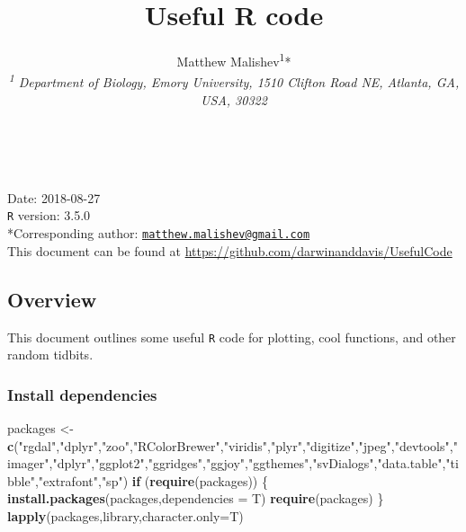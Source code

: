 \documentclass[10,portrait]{article}
\title{Useful R code}
\author{Matthew Malishev\textsuperscript{1}*\\
\emph{\textsuperscript{1} Department of Biology, Emory University, 1510
Clifton Road NE, Atlanta, GA, USA, 30322}}
\date{}
\newenvironment{Shaded}{\begin{snugshade}}{\end{snugshade}}
\newcommand{\KeywordTok}[1]{\textcolor[rgb]{0.13,0.29,0.53}{\textbf{#1}}}
\newcommand{\DataTypeTok}[1]{\textcolor[rgb]{0.13,0.29,0.53}{#1}}
\newcommand{\StringTok}[1]{\textcolor[rgb]{0.31,0.60,0.02}{#1}}
\newcommand{\ControlFlowTok}[1]{\textcolor[rgb]{0.13,0.29,0.53}{\textbf{#1}}}
\newcommand{\NormalTok}[1]{#1}
\begin{document}
\maketitle

{
\hypersetup{linkcolor=black}
\setcounter{tocdepth}{4}
\tableofcontents
}
~

Date: 2018-08-27\\
\texttt{R} version: 3.5.0\\
*Corresponding author:
\href{mailto:matthew.malishev@gmail.com}{\nolinkurl{matthew.malishev@gmail.com}}\\
This document can be found at
\url{https://github.com/darwinanddavis/UsefulCode}

\newpage  

\subsection{Overview}\label{overview}

This document outlines some useful \texttt{R} code for plotting, cool
functions, and other random tidbits.

\subsubsection{Install dependencies}\label{install-dependencies}

\begin{Shaded}
\begin{Highlighting}[]
\NormalTok{packages <-}\StringTok{ }\KeywordTok{c}\NormalTok{(}\StringTok{"rgdal"}\NormalTok{,}\StringTok{"dplyr"}\NormalTok{,}\StringTok{"zoo"}\NormalTok{,}\StringTok{"RColorBrewer"}\NormalTok{,}\StringTok{"viridis"}\NormalTok{,}\StringTok{"plyr"}\NormalTok{,}\StringTok{"digitize"}\NormalTok{,}\StringTok{"jpeg"}\NormalTok{,}\StringTok{"devtools"}\NormalTok{,}\StringTok{"imager"}\NormalTok{,}\StringTok{"dplyr"}\NormalTok{,}\StringTok{"ggplot2"}\NormalTok{,}\StringTok{"ggridges"}\NormalTok{,}\StringTok{"ggjoy"}\NormalTok{,}\StringTok{"ggthemes"}\NormalTok{,}\StringTok{"svDialogs"}\NormalTok{,}\StringTok{"data.table"}\NormalTok{,}\StringTok{"tibble"}\NormalTok{,}\StringTok{"extrafont"}\NormalTok{,}\StringTok{"sp"}\NormalTok{)   }
\ControlFlowTok{if}\NormalTok{ (}\KeywordTok{require}\NormalTok{(packages)) \{}
    \KeywordTok{install.packages}\NormalTok{(packages,}\DataTypeTok{dependencies =}\NormalTok{ T)}
    \KeywordTok{require}\NormalTok{(packages)}
\NormalTok{\}}
\KeywordTok{lapply}\NormalTok{(packages,library,}\DataTypeTok{character.only=}\NormalTok{T)}
\end{Highlighting}
\end{Shaded}
\end{document}
